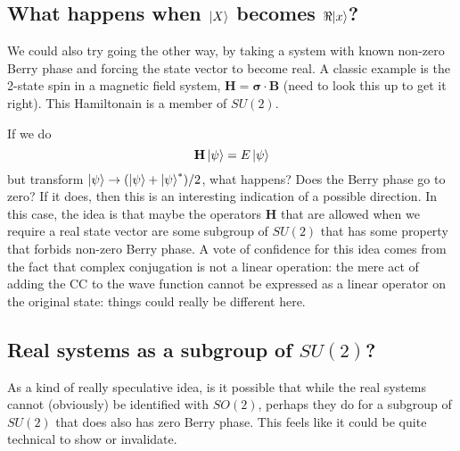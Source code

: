 \documentclass[11pt]{article}
\begin{document}
\subsection{What happens when $\ket{X}$ becomes $\Re{\ket{x}}$?}
\label{sec:real_from_spin}

We could also try going the other way, by taking a system with known non-zero Berry phase and forcing the state vector to become real.
A classic example is the 2-state spin in a magnetic field system, $\mathbf{H} = \mathbf{\sigma} \cdot \mathbf{B}$ (need to look this up to get it right).
This Hamiltonain is a member of $SU(2)$.

If we do
\begin{equation}
  \label{eq:spin}
  \mathbf{H} \ket{\psi} = E \ket{\psi}
\end{equation}
but transform $\ket{\psi} \to (\ket{\psi} + \ket{\psi}^*)/2$, what happens?
Does the Berry phase go to zero?
If it does, then this is an interesting indication of a possible direction.
In this case, the idea is that maybe the operators $\mathbf{H}$ that are allowed when we require a real state vector are some subgroup of $SU(2)$ that has some property that forbids non-zero Berry phase.
A vote of confidence for this idea comes from the fact that complex conjugation is not a linear operation: the mere act of adding the CC to the wave function cannot be expressed as a linear operator on the original state: things could really be different here.

\subsection{Real systems as a subgroup of $SU(2)$?}
\label{sec:real_subgroup}

As a kind of really speculative idea, is it possible that while the real systems cannot (obviously) be identified with $SO(2)$, perhaps they do for a subgroup of $SU(2)$ that does also has zero Berry phase.
This feels like it could be quite technical to show or invalidate.
\end{document}
